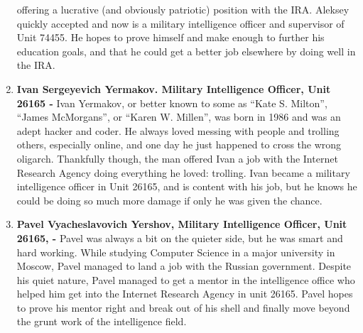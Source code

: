\documentclass[10pt, letterpaper]{article}
\begin{document}
\begin{enumerate}
  offering a lucrative (and obviously patriotic) position with the IRA.
  Aleksey quickly accepted and now is a military intelligence officer
  and supervisor of Unit 74455. He hopes to prove himself and make
  enough to further his education goals, and that he could get a better
  job elsewhere by doing well in the IRA.
\item
  \textbf{Ivan Sergeyevich Yermakov. Military Intelligence Officer, Unit
  26165 -} Ivan Yermakov, or better known to some as ``Kate S. Milton'',
  ``James McMorgans'', or ``Karen W. Millen'', was born in 1986 and was
  an adept hacker and coder. He always loved messing with people and
  trolling others, especially online, and one day he just happened to
  cross the wrong oligarch. Thankfully though, the man offered Ivan a
  job with the Internet Research Agency doing everything he loved:
  trolling. Ivan became a military intelligence officer in Unit 26165,
  and is content with his job, but he knows he could be doing so much
  more damage if only he was given the chance.
\item 
  \textbf{Pavel Vyacheslavovich Yershov, Military Intelligence Officer,
  Unit 26165, -} Pavel was always a bit on the quieter side, but he was
  smart and hard working. While studying Computer Science in a major
  university in Moscow, Pavel managed to land a job with the Russian
  government. Despite his quiet nature, Pavel managed to get a mentor in
  the intelligence office who helped him get into the Internet Research
  Agency in unit 26165. Pavel hopes to prove his mentor right and break
  out of his shell and finally move beyond the grunt work of the
  intelligence field.
\end{enumerate}
\end{document}
